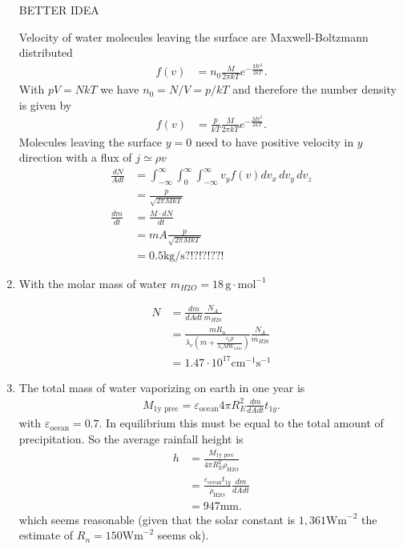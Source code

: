 \documentclass[../main.tex]{subfiles}
\begin{document}
\begin{enumerate}[label=(\alph*)]
BETTER IDEA

Velocity of water molecules leaving the surface are Maxwell-Boltzmann distributed
\begin{align}
f(v)
&=n_0\frac{M}{2\pi kT}e^{-\frac{Mv^2}{2kT}}.
\end{align}
With $pV=NkT$ we have $n_0=N/V=p/kT$ and therefore the number density is given by
\begin{align}
f(v)
&=\frac{p}{kT}\frac{M}{2\pi kT}e^{-\frac{Mv^2}{2kT}}.
\end{align}
Molecules leaving the surface $y=0$ need to have positive velocity in $y$ direction with a flux of $j\simeq\rho v$
\begin{align}
\frac{dN}{Adt}&=\int_{-\infty}^\infty\int_{0}^\infty\int_{-\infty}^\infty v_y f(v) dv_x\,dv_y\,dv_z\\
&=\frac{p}{\sqrt{2\pi MkT}}\\
\frac{dm}{dt}
&=\frac{M\cdot dN}{dt}\\
&=mA\frac{p}{\sqrt{2\pi MkT}}\\
&=0.5\text{kg/s}?!?!?!??!
\end{align}




\item With the molar mass of water $m_{H2O}=18\,\text{g}\cdot\text{mol}^{-1}$

\begin{align}
    N&=\frac{dm}{dA dt} \frac{N_A}{m_{H20}}\\
    &=\frac{m R_n}{\lambda_v(m+\frac{c_p p}{\lambda_v MW_\text{ratio}})}\frac{N_A}{m_{H20}}\\
    &=1.47\cdot10^{17}\text{cm}^{-1}\text{s}^{-1}
\end{align}

\item The total mass of water vaporizing on earth in one year is
\begin{align}
    M_\text{1y prec}=\varepsilon_\text{ocean} 4\pi R_E^2  \frac{dm}{dA dt} t_{1y}.
\end{align}
with $\varepsilon_\text{ocean}=0.7$. In equilibrium this must be equal to the total amount of precipitation. So the average rainfall height is 
\begin{align}
    h&=\frac{M_\text{1y prec}}{4\pi R_E^2\rho_\text{H2O}}\\
    &=\frac{\varepsilon_\text{ocean}t_{1y}}{\rho_\text{H2O}} \frac{dm}{dA dt}\\
    &=947\text{mm}.
\end{align}
which seems reasonable (given that the solar constant is $1,361\text{Wm}^{-2}$ the estimate of $R_n=150\text{Wm}^{-2}$ seems ok).
\end{enumerate}
\end{document}
